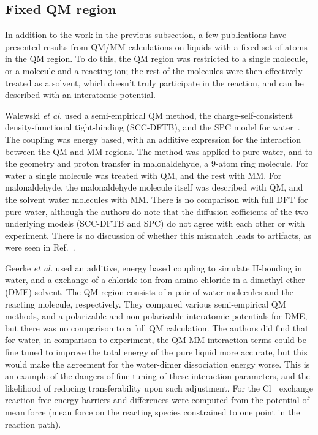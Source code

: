 \documentclass[11pt]{revtex4}
\begin{document}
\subsection{Fixed QM region}

In addition to the work in the previous subsection, a few publications
have presented results from QM/MM calculations on liquids with a
fixed set of atoms in the QM region.  To do this, the QM region
was restricted to a single molecule, or a molecule and a reacting
ion;  the rest of the molecules were then effectively treated
as a solvent, which doesn't truly participate in the reaction,
and can be described with an interatomic potential.

Walewski {\it et al.} used a semi-empirical QM method, the
charge-self-consistent density-functional tight-binding (SCC-DFTB),
and the SPC model for water~\cite{walewski_chem_phys_lett_2004a}.
The coupling was energy based, with an additive expression for the
interaction between the QM and MM regions.  The method was applied
to pure water, and to the geometry and proton transfer in malonaldehyde,
a 9-atom ring molecule.  For water a single molecule was treated
with QM, and the rest with MM.  For malonaldehyde, the malonaldehyde
molecule itself was described with QM, and the solvent water molecules
with MM.  There is no comparison with full DFT for pure water,
although the authors do note that the diffusion cofficients of the
two underlying models (SCC-DFTB and SPC) do not agree with each
other or with experiment.  There is no discussion of whether this
mismatch leads to artifacts, as were seen in
Ref.~.

Geerke {\it et al.} used an additive, energy based coupling to
simulate H-bonding in water, and a exchange of a chloride ion from
amino chloride in a dimethyl ether (DME) solvent.  The QM region
consists of a pair of water molecules and the reacting molecule,
respectively.  They compared various semi-empirical QM methods, and
a polarizable and non-polarizable interatomic potentials for DME,
but there was no comparison to a full QM calculation.  The authors
did find that for water, in comparison to experiment, the QM-MM
interaction terms could be fine tuned to improve the total energy
of the pure liquid more accurate, but this would make the agreement
for the water-dimer dissociation energy worse.  This is an example
of the dangers of fine tuning of these interaction parameters, and
the likelihood of reducing transferability upon such adjustment.
For the Cl$^-$ exchange reaction free energy barriers and differences
were computed from the potential of mean force (mean force on the
reacting species constrained to one point in the reaction path).
\end{document}
